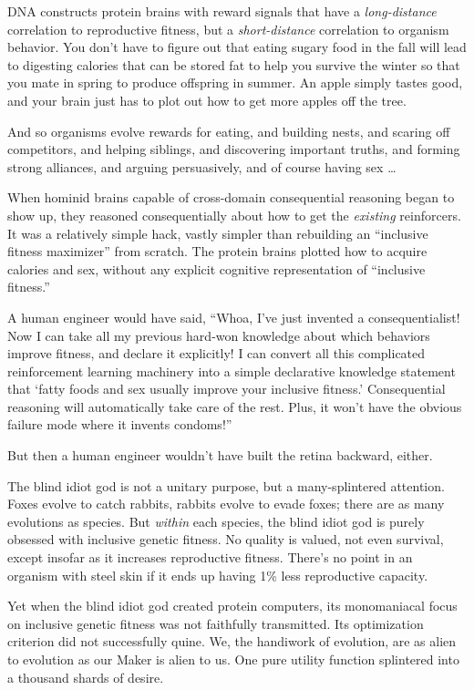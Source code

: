 {
 DNA constructs protein brains with reward signals that have a
\textit{long-distance} correlation to reproductive fitness, but a
\textit{short-distance} correlation to organism behavior. You
don't have to figure out that eating sugary food in the
fall will lead to digesting calories that can be stored fat to help you
survive the winter so that you mate in spring to produce offspring in
summer. An apple simply tastes good, and your brain just has to plot
out how to get more apples off the tree.}

{
 And so organisms evolve rewards for eating, and building nests,
and scaring off competitors, and helping siblings, and discovering
important truths, and forming strong alliances, and arguing
persuasively, and of course having sex \ldots}

{
 When hominid brains capable of cross-domain consequential
reasoning began to show up, they reasoned consequentially about how to
get the \textit{existing} reinforcers. It was a relatively simple hack,
vastly simpler than rebuilding an ``inclusive fitness
maximizer'' from scratch. The protein brains plotted
how to acquire calories and sex, without any explicit cognitive
representation of ``inclusive
fitness.''}

{
 A human engineer would have said, ``Whoa,
I've just invented a consequentialist! Now I can take
all my previous hard-won knowledge about which behaviors improve
fitness, and declare it explicitly! I can convert all this complicated
reinforcement learning machinery into a simple declarative knowledge
statement that `fatty foods and sex usually improve your
inclusive fitness.' Consequential reasoning will
automatically take care of the rest. Plus, it won't
have the obvious failure mode where it invents
condoms!''}

{
 But then a human engineer wouldn't have built the
retina backward, either.}

{
 The blind idiot god is not a unitary purpose, but a
many-splintered attention. Foxes evolve to catch rabbits, rabbits
evolve to evade foxes; there are as many evolutions as species. But
\textit{within} each species, the blind idiot god is purely obsessed
with inclusive genetic fitness. No quality is valued, not even
survival, except insofar as it increases reproductive fitness.
There's no point in an organism with steel skin if it
ends up having 1\% less reproductive capacity.}

{
 Yet when the blind idiot god created protein computers, its
monomaniacal focus on inclusive genetic fitness was not faithfully
transmitted. Its optimization criterion did not successfully quine. We,
the handiwork of evolution, are as alien to evolution as our Maker is
alien to us. One pure utility function splintered into a thousand
shards of desire.}

